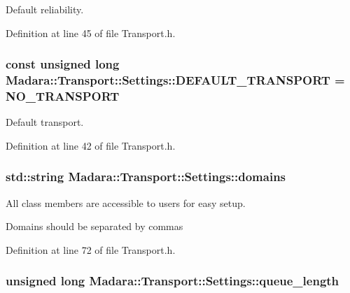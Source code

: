 Default reliability. 



Definition at line 45 of file Transport.h.

\hypertarget{classMadara_1_1Transport_1_1Settings_a48f5fdda61c339261aba80be0dc0407b}{
\subsubsection[{DEFAULT\_\-TRANSPORT}]{\setlength{\rightskip}{0pt plus 5cm}const unsigned long {\bf Madara::Transport::Settings::DEFAULT\_\-TRANSPORT} = NO\_\-TRANSPORT}}
\label{d1/d14/classMadara_1_1Transport_1_1Settings_a48f5fdda61c339261aba80be0dc0407b}


Default transport. 



Definition at line 42 of file Transport.h.

\hypertarget{classMadara_1_1Transport_1_1Settings_acc01f153d1de27dd9f1bf8e1469619a8}{
\subsubsection[{domains}]{\setlength{\rightskip}{0pt plus 5cm}std::string {\bf Madara::Transport::Settings::domains}}}
\label{d1/d14/classMadara_1_1Transport_1_1Settings_acc01f153d1de27dd9f1bf8e1469619a8}


All class members are accessible to users for easy setup. 

Domains should be separated by commas 

Definition at line 72 of file Transport.h.

\hypertarget{classMadara_1_1Transport_1_1Settings_a254ee749bceeef8500f2c27a78b9c628}{
\subsubsection[{queue\_\-length}]{\setlength{\rightskip}{0pt plus 5cm}unsigned long {\bf Madara::Transport::Settings::queue\_\-length}}}
\label{d1/d14/classMadara_1_1Transport_1_1Settings_a254ee749bceeef8500f2c27a78b9c628}



